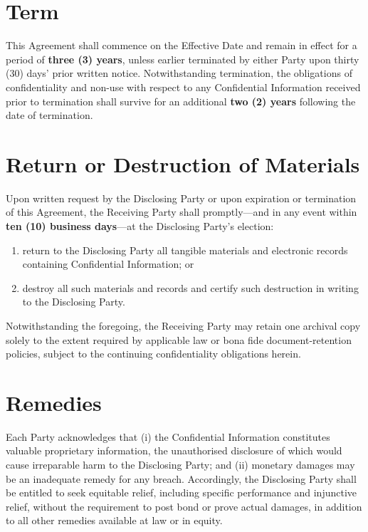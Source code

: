 \documentclass[11pt, a4paper]{article}
\begin{document}
\section{Term}

\noindent
This Agreement shall commence on the Effective Date and remain in effect for a
period of \textbf{three (3) years}, unless earlier terminated by either Party
upon thirty (30) days' prior written notice. Notwithstanding termination, the
obligations of confidentiality and non-use with respect to any Confidential
Information received prior to termination shall survive for an additional
\textbf{two (2) years} following the date of termination.

\section{Return or Destruction of Materials}

\noindent
Upon written request by the Disclosing Party or upon expiration or termination
of this Agreement, the Receiving Party shall promptly—and in any event within
\textbf{ten (10) business days}—at the Disclosing Party's election:

\begin{enumerate}
  \item return to the Disclosing Party all tangible materials and electronic
        records containing Confidential Information; or
  \item destroy all such materials and records and certify such destruction in
        writing to the Disclosing Party.
\end{enumerate}

\noindent
Notwithstanding the foregoing, the Receiving Party may retain one archival copy
solely to the extent required by applicable law or bona fide document-retention
policies, subject to the continuing confidentiality obligations herein.

\section{Remedies}

\noindent
Each Party acknowledges that (i) the Confidential Information constitutes
valuable proprietary information, the unauthorised disclosure of which would
cause irreparable harm to the Disclosing Party; and (ii) monetary damages may
be an inadequate remedy for any breach. Accordingly, the Disclosing Party shall
be entitled to seek equitable relief, including specific performance and
injunctive relief, without the requirement to post bond or prove actual damages,
in addition to all other remedies available at law or in equity.
\end{document}
